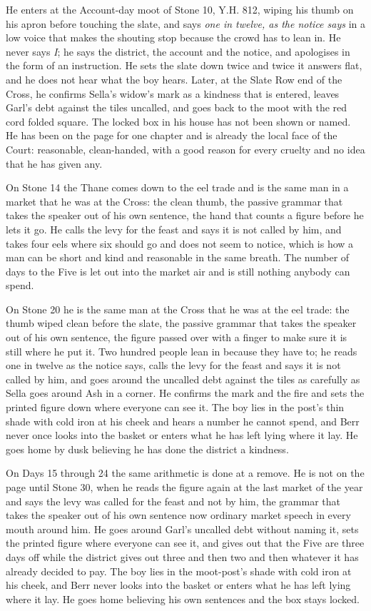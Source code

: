 \documentclass{design/chronicle}
\begin{document}
{
He enters at the Account-day moot of Stone 10, Y.H. 812, wiping his thumb on his apron before touching the slate, and says \emph{one in twelve, as the notice says} in a low voice that makes the shouting stop because the crowd has to lean in. He never says \emph{I}; he says the district, the account and the notice, and apologises in the form of an instruction. He sets the slate down twice and twice it answers flat, and he does not hear what the boy hears. Later, at the Slate Row end of the Cross, he confirms Sella’s widow’s mark as a kindness that is entered, leaves Garl’s debt against the tiles uncalled, and goes back to the moot with the red cord folded square. The locked box in his house has not been shown or named. He has been on the page for one chapter and is already the local face of the Court: reasonable, clean-handed, with a good reason for every cruelty and no idea that he has given any.

On Stone 14 the Thane comes down to the eel trade and is the same man in a market that he was at the Cross: the clean thumb, the passive grammar that takes the speaker out of his own sentence, the hand that counts a figure before he lets it go. He calls the levy for the feast and says it is not called by him, and takes four eels where six should go and does not seem to notice, which is how a man can be short and kind and reasonable in the same breath. The number of days to the Five is let out into the market air and is still nothing anybody can spend.

On Stone 20 he is the same man at the Cross that he was at the eel trade: the thumb wiped clean before the slate, the passive grammar that takes the speaker out of his own sentence, the figure passed over with a finger to make sure it is still where he put it. Two hundred people lean in because they have to; he reads one in twelve as the notice says, calls the levy for the feast and says it is not called by him, and goes around the uncalled debt against the tiles as carefully as Sella goes around Ash in a corner. He confirms the mark and the fire and sets the printed figure down where everyone can see it. The boy lies in the post’s thin shade with cold iron at his cheek and hears a number he cannot spend, and Berr never once looks into the basket or enters what he has left lying where it lay. He goes home by dusk believing he has done the district a kindness.

On Days 15 through 24 the same arithmetic is done at a remove. He is not on the page until Stone 30, when he reads the figure again at the last market of the year and says the levy was called for the feast and not by him, the grammar that takes the speaker out of his own sentence now ordinary market speech in every mouth around him. He goes around Garl’s uncalled debt without naming it, sets the printed figure where everyone can see it, and gives out that the Five are three days off while the district gives out three and then two and then whatever it has already decided to pay. The boy lies in the moot-post’s shade with cold iron at his cheek, and Berr never looks into the basket or enters what he has left lying where it lay. He goes home believing his own sentences and the box stays locked.

}
\end{document}
